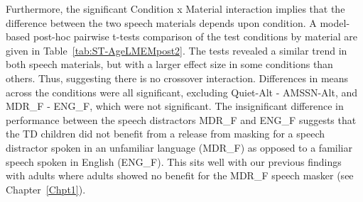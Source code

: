 \documentclass[a4paper, twoside]{templates/ociamthesis}
\begin{document}
Furthermore, the significant Condition x Material interaction implies that the difference between the two speech materials depends upon condition. A model-based post-hoc pairwise t-tests comparison of the test conditions by material are given in Table~\ref{tab:ST-AgeLMEMpost2}. The tests revealed a similar trend in both speech materials, but with a larger effect size in some conditions than others. Thus, suggesting there is no crossover interaction. Differences in means across the conditions were all significant, excluding Quiet-Alt - AMSSN-Alt, and MDR\_F - ENG\_F, which were not significant. The insignificant difference in performance between the speech distractors MDR\_F and ENG\_F suggests that the TD children did not benefit from a release from masking for a speech distractor spoken in an unfamiliar language (MDR\_F) as opposed to a familiar speech spoken in English (ENG\_F). This sits well with our previous findings with adults where adults showed no benefit for the MDR\_F speech masker (see Chapter~\ref{Chpt1}).\\
\end{document}

